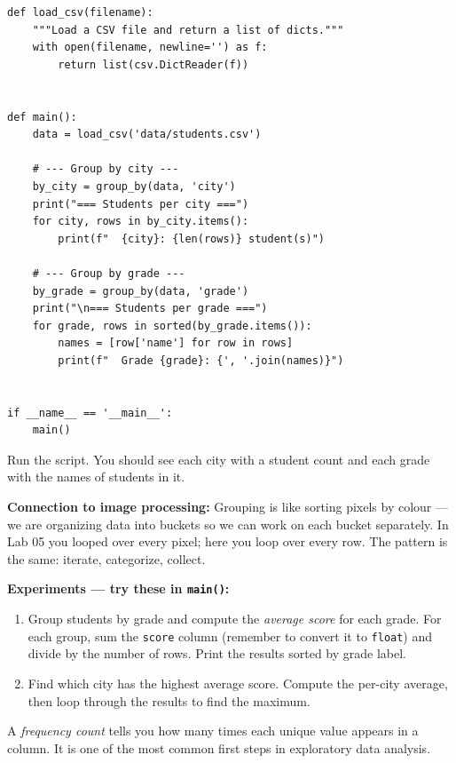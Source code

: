 \documentclass{cslab}
\begin{document}
\begin{lstlisting}
def load_csv(filename):
    """Load a CSV file and return a list of dicts."""
    with open(filename, newline='') as f:
        return list(csv.DictReader(f))


def main():
    data = load_csv('data/students.csv')

    # --- Group by city ---
    by_city = group_by(data, 'city')
    print("=== Students per city ===")
    for city, rows in by_city.items():
        print(f"  {city}: {len(rows)} student(s)")

    # --- Group by grade ---
    by_grade = group_by(data, 'grade')
    print("\n=== Students per grade ===")
    for grade, rows in sorted(by_grade.items()):
        names = [row['name'] for row in rows]
        print(f"  Grade {grade}: {', '.join(names)}")


if __name__ == '__main__':
    main()
\end{lstlisting}

Run the script. You should see each city with a student count and each grade with the names of students in it.

\begin{note}
\textbf{Connection to image processing:} Grouping is like sorting pixels by colour --- we are organizing data into buckets so we can work on each bucket separately. In Lab 05 you looped over every pixel; here you loop over every row. The pattern is the same: iterate, categorize, collect.
\end{note}

\textbf{Experiments --- try these in \texttt{main()}:}
\begin{enumerate}
    \item Group students by grade and compute the \emph{average score} for each grade.
          For each group, sum the \texttt{score} column (remember to convert it to
          \texttt{float}) and divide by the number of rows.
          Print the results sorted by grade label.
    \item Find which city has the highest average score. Compute the per-city
          average, then loop through the results to find the maximum.
\end{enumerate}


A \emph{frequency count} tells you how many times each unique value appears in a column. It is one of the most common first steps in exploratory data analysis.
\end{document}
